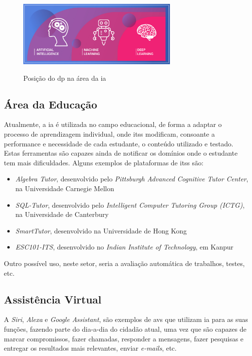 \documentclass{report}
\begin{document}
\begin{figure}[H]
\caption{Posição do \ac{dp} na área da \ac{ia}}
\centering
\includegraphics[width=8cm]{imagens/cadeia.jpg}
\label{cadeia}
\end{figure}

\nocite{cadeia}

\subsection{Área da Educação}
\label{subsec.educacao}

	Atualmente, a \ac{ia} é utilizada no campo educacional, de forma a adaptar o processo de aprendizagem individual, onde \ac{itss} modificam, consoante a performance e necessidade de cada estudante, o conteúdo utilizado e testado. Estas ferramentas são capazes ainda de notificar os domínios onde o estudante tem mais dificuldades. \cite{educacao1} \cite{educacao2}
	Alguns exemplos de plataformas de \ac{itss} são: \cite{itss}
	
\begin{itemize}
	\item \textit{Algebra Tutor}, desenvolvido pelo \textit{Pittsburgh Advanced Cognitive Tutor Center}, na Universidade Carnegie Mellon
	\item \textit{SQL-Tutor}, desenvolvido pelo \textit{Intelligent Computer Tutoring Group (ICTG)}, na Universidade de Canterbury
	\item \textit{SmartTutor}, desenvolvido na Universidade de Hong Kong
	\item \textit{ESC101-ITS}, desenvolvido no \textit{Indian Institute of Technology}, em Kanpur

\end{itemize}
	
	Outro possível uso, neste setor, seria a avaliação automática de trabalhos, testes, etc.

\subsection{Assistência Virtual}
\label{subsec.assistencia}

	A \textit{Siri}, \textit{Alexa} e \textit{Google Assistant}, são exemplos de \ac{avs} que utilizam \ac{ia} para as suas funções, fazendo parte do dia-a-dia do cidadão atual, uma vez que são capazes de marcar compromissos, fazer chamadas, responder a mensagens, fazer pesquisas e entregar os resultados mais relevantes, enviar \textit{e-mails}, etc.
	
\end{document}
